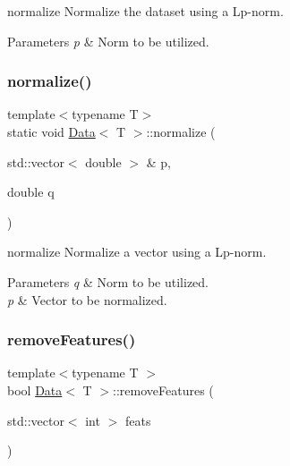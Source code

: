 normalize Normalize the dataset using a Lp-\/norm. 


\begin{DoxyParams}{Parameters}
{\em p} & Norm to be utilized. \\
\hline
\end{DoxyParams}
\mbox{\label{class_data_a11440c71d8f4dc4f4c064c06c0ae1b4e}} 
\subsubsection{\texorpdfstring{normalize()}{normalize()}\hspace{0.1cm}{\footnotesize\ttfamily [2/2]}}
{\footnotesize\ttfamily template$<$typename T$>$ \\
static void \hyperlink{class_data}{Data}$<$ T $>$\+::normalize (\begin{DoxyParamCaption}\item[{std\+::vector$<$ double $>$ \&}]{p,  }\item[{double}]{q }\end{DoxyParamCaption})\hspace{0.3cm}{\ttfamily [static]}}



normalize Normalize a vector using a Lp-\/norm. 


\begin{DoxyParams}{Parameters}
{\em q} & Norm to be utilized. \\
\hline
{\em p} & Vector to be normalized. \\
\hline
\end{DoxyParams}
\mbox{\label{class_data_a574b881ce5042c5a13d79c187aa3f923}} 
\subsubsection{\texorpdfstring{remove\+Features()}{removeFeatures()}}
{\footnotesize\ttfamily template$<$typename T $>$ \\
bool \hyperlink{class_data}{Data}$<$ T $>$\+::remove\+Features (\begin{DoxyParamCaption}\item[{std\+::vector$<$ int $>$}]{feats }\end{DoxyParamCaption})}




